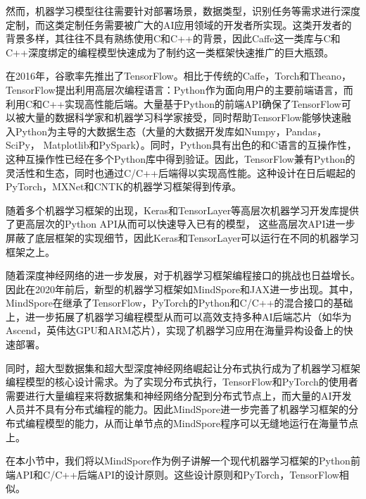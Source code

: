 \documentclass[letterpaper,10pt,english]{sphinxmanual}
\begin{document}
\sphinxAtStartPar
然而，机器学习模型往往需要针对部署场景，数据类型，识别任务等需求进行深度定制，而这类定制任务需要被广大的AI应用领域的开发者所实现。这类开发者的背景多样，其往往不具有熟练使用C和C++的背景，因此Caffe这一类库与C和C++深度绑定的编程模型快速成为了制约这一类框架快速推广的巨大瓶颈。

\sphinxAtStartPar
在2016年，谷歌率先推出了TensorFlow。相比于传统的Caffe，Torch和Theano，TensorFlow提出利用高层次编程语言：Python作为面向用户的主要前端语言，而利用C和C++实现高性能后端。大量基于Python的前端API确保了TensorFlow可以被大量的数据科学家和机器学习科学家接受，同时帮助TensorFlow能够快速融入Python为主导的大数据生态（大量的大数据开发库如Numpy，Pandas，SciPy，
Matplotlib和PySpark）。同时，Python具有出色的和C语言的互操作性，这种互操作性已经在多个Python库中得到验证。因此，TensorFlow兼有Python的灵活性和生态，同时也通过C/C++后端得以实现高性能。这种设计在日后崛起的PyTorch，MXNet和CNTK的机器学习框架得到传承。

\sphinxAtStartPar
随着多个机器学习框架的出现，Keras和TensorLayer等高层次机器学习开发库提供了更高层次的Python
API从而可以快速导入已有的模型，
这些高层次API进一步屏蔽了底层框架的实现细节，因此Keras和TensorLayer可以运行在不同的机器学习框架之上。

\sphinxAtStartPar
随着深度神经网络的进一步发展，对于机器学习框架编程接口的挑战也日益增长。因此在2020年前后，新型的机器学习框架如MindSpore和JAX进一步出现。其中，MindSpore在继承了TensorFlow，PyTorch的Python和C/C++的混合接口的基础上，进一步拓展了机器学习编程模型从而可以高效支持多种AI后端芯片（如华为Ascend，英伟达GPU和ARM芯片），实现了机器学习应用在海量异构设备上的快速部署。

\sphinxAtStartPar
同时，超大型数据集和超大型深度神经网络崛起让分布式执行成为了机器学习框架编程模型的核心设计需求。为了实现分布式执行，TensorFlow和PyTorch的使用者需要进行大量编程来将数据集和神经网络分配到分布式节点上，而大量的AI开发人员并不具有分布式编程的能力。因此MindSpore进一步完善了机器学习框架的分布式编程模型的能力，从而让单节点的MindSpore程序可以无缝地运行在海量节点上。

\sphinxAtStartPar
在本小节中，我们将以MindSpore作为例子讲解一个现代机器学习框架的Python前端API和C/C++后端API的设计原则。这些设计原则和PyTorch，TensorFlow相似。
\end{document}
